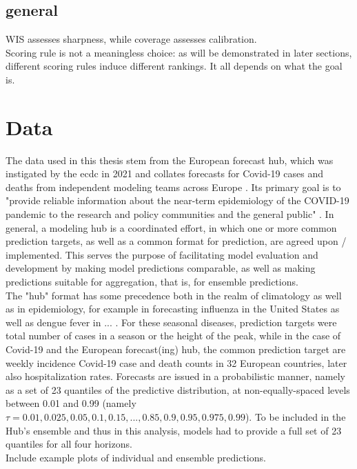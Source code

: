 \subsection{general}
WIS assesses sharpness, while coverage assesses calibration.\\
Scoring rule is not a meaningless choice: as will be demonstrated in later sections, different scoring rules induce different rankings. It all depends on what the goal is.
\section{Data}
The data used in this thesis stem from the European forecast hub, which was instigated by the \ac{ecdc} in 2021 and collates forecasts for Covid-19 cases and deaths from independent modeling teams across Europe \citep{european_covid-19_forecast_hub_european_2021}. Its primary goal is to "provide reliable information about the near-term epidemiology of the COVID-19 pandemic to the research and policy communities and the general public"  \citep{sherratt_draft_nodate}. In general, a modeling hub is a coordinated effort, in which one or more common prediction targets, as well as a common format for prediction, are agreed upon / implemented. This serves the purpose of facilitating model evaluation and development by making model predictions comparable, as well as making predictions suitable for aggregation, that is, for ensemble predictions. \\
The "hub" format has some precedence both in the realm of climatology as well as in epidemiology, for example in forecasting influenza in the United States \cite{reich_collaborative_2019} as well as dengue fever in ... \cite{johansson_open_2019}. For these seasonal diseases, prediction targets were total number of cases in a season or the height of the peak, while in the case of Covid-19 and the European forecast(ing) hub, the common prediction target are weekly incidence Covid-19 case and death counts in 32  European countries, later also hospitalization rates. Forecasts are issued in a probabilistic manner, namely as a set of 23 quantiles of the predictive distribution, at non-equally-spaced levels between 0.01 and 0.99 (namely $\tau = 0.01, 0.025, 0.05, 0.1, 0.15, ..., 0.85, 0.9, 0.95, 0.975, 0.99$).
To be included in the Hub's ensemble and thus in this analysis, models had to provide a full set of 23 quantiles for all four horizons.\\
Include example plots of individual and ensemble predictions.\\
